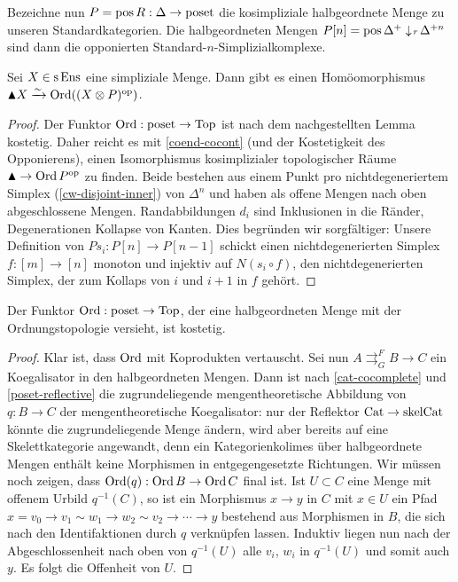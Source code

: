 Bezeichne nun $P = \operatorname{pos} R: \Delta \to \operatorname{poset}$ die kosimpliziale
halbgeordnete Menge zu unseren Standardkategorien. Die halbgeordneten
Mengen $P[n] = \operatorname{pos} \Delta^+ \downarrow \! {\scriptstyle r} \, \Delta^{+n}$ sind dann die
opponierten Standard-$n$-Simplizialkomplexe.
\begin{prop} \label{clumsy-order-top}
  Sei $X \in \operatorname{s}\operatorname{Ens}$ eine simpliziale Menge. Dann gibt es einen
  Homöomorphismus $\blacktriangle X \xrightarrow[]{\sim} \operatorname{Ord}((X \otimes P)^\mathrm{op})$.
\end{prop}
\begin{proof}
  Der Funktor $\operatorname{Ord}: \operatorname{poset} \to \operatorname{Top}$ ist nach dem nachgestellten
  Lemma kostetig. Daher reicht es mit \ref{coend-cocont} (und der
  Kostetigkeit des Opponierens), einen Isomorphismus kosimplizialer
  topologischer Räume $\blacktriangle \to \operatorname{Ord} P^\mathrm{op}$ zu finden. Beide
  bestehen aus einem Punkt pro nichtdegeneriertem Simplex
  (\ref{cw-disjoint-inner}) von $\Delta^n$ und haben als offene Mengen
  nach oben abgeschlossene Mengen. Randabbildungen $d_i$ sind
  Inklusionen in die Ränder, Degenerationen Kollapse von Kanten. Dies
  begründen wir sorgfältiger: Unsere Definition von $Ps_i: P[n] \to
  P[n-1]$ schickt einen nichtdegenerierten Simplex $f: [m] \to [n]$
  monoton und injektiv auf $N(s_i \circ f)$, den nichtdegenerierten
  Simplex, der zum Kollaps von $i$ und $i+1$ in $f$ gehört.
\end{proof}
\begin{lemma}
  Der Funktor $\operatorname{Ord}: \operatorname{poset} \to \operatorname{Top}$, der eine halbgeordneten Menge
  mit der Ordnungstopologie versieht, ist kostetig.
\end{lemma}
\begin{proof}
    Klar ist, dass $\operatorname{Ord}$ mit Koprodukten vertauscht. Sei nun $A
    \mathrel{\mathop{\rightrightarrows}^{F}_{G}} B \to C$ ein
    Koegalisator in den halbgeordneten Mengen. Dann ist nach
    \ref{cat-cocomplete} und \ref{poset-reflective} die
    zugrundeliegende mengentheoretische Abbildung von $q: B \to C$ der
    mengentheoretische Koegalisator: nur der Reflektor $\operatorname{Cat} \to
    \mathrm{skelCat}$ könnte die zugrundeliegende Menge ändern, wird
    aber bereits auf eine Skelettkategorie angewandt, denn ein
    Kategorienkolimes über halbgeordnete Mengen enthält keine
    Morphismen in entgegengesetzte Richtungen. Wir müssen noch zeigen,
    dass $\operatorname{Ord}(q): \operatorname{Ord} B \to \operatorname{Ord} C$ final ist. Ist $U \subset C$
    eine Menge mit offenem Urbild $q^{-1}(C)$, so ist ein Morphismus
    $x \to y$ in $C$ mit $x \in U$ ein Pfad $x = v_0 \to v_1 \sim w_1
    \to w_2 \sim v_2 \to \cdots \to y$ bestehend aus Morphismen in
    $B$, die sich nach den Identifaktionen durch $q$ verknüpfen
    lassen. Induktiv liegen nun nach der Abgeschlossenheit nach oben
    von $q^{-1}(U)$ alle $v_i$, $w_i$ in $q^{-1}(U)$ und somit auch
    $y$. Es folgt die Offenheit von $U$.
\end{proof}

